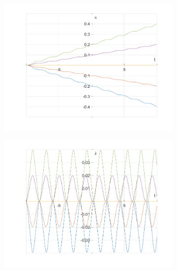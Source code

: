 \documentclass{article}
\begin{document}
	\begin{figure}[h!]
		\centering
		\begin{subfigure}[b]{0.48\linewidth}
			\includegraphics[width=\linewidth]{./SmallOscillations/S5/F3.png}
		\end{subfigure}
		\begin{subfigure}[b]{0.48\linewidth}
			\includegraphics[width=\linewidth]{./SmallOscillations/S5/F4.png}
		\end{subfigure}
	\end{figure}
	
\end{document}
